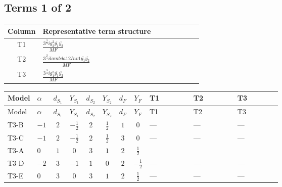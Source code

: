\documentclass[8pt]{article}
\begin{document}
\begin{landscape}
\subsection*{Terms 1 of 2}
\begin{center}
\begin{tabular}{@{}c >{\raggedright\arraybackslash}p{0.82\linewidth}@{}}
\toprule
Column & Representative term structure \\
\midrule
T1 & \(\displaystyle \frac{3^{\frac{3}{4}} i g_{2}^{2} \overline{y_{1}} \overline{y_{2}}}{MF}\) \\
\midrule
T2 & \(\displaystyle \frac{3^{\frac{3}{4}} i lambda12Inv1 \overline{y_{1}} \overline{y_{2}}}{MF}\) \\
\midrule
T3 & \(\displaystyle \frac{3^{\frac{3}{4}} i g_{1}^{2} \overline{y_{1}} \overline{y_{2}}}{MF}\) \\
\midrule
\bottomrule
\end{tabular}
\end{center}
\smallskip
\tiny
\begin{longtable}{@{}llcccccc >{\raggedright\arraybackslash}p{0.21\linewidth} >{\raggedright\arraybackslash}p{0.21\linewidth} >{\raggedright\arraybackslash}p{0.21\linewidth}@{}}
\toprule
Model & $\alpha$ & $d_{S_1}$ & $Y_{S_1}$ & $d_{S_2}$ & $Y_{S_2}$ & $d_F$ & $Y_F$ & T1 & T2 & T3 \\
\midrule
\endfirsthead
\toprule
Model & $\alpha$ & $d_{S_1}$ & $Y_{S_1}$ & $d_{S_2}$ & $Y_{S_2}$ & $d_F$ & $Y_F$ & T1 & T2 & T3 \\
\midrule
\endhead
T3-B & $-1$ & $2$ & $-\frac{1}{2}$ & $2$ & $\frac{1}{2}$ & $1$ & $0$ & --- & --- & --- \\
\midrule
T3-C & $-1$ & $2$ & $-\frac{1}{2}$ & $2$ & $\frac{1}{2}$ & $3$ & $0$ & --- & --- & --- \\
\midrule
T3-A & $0$ & $1$ & $0$ & $3$ & $1$ & $2$ & $\frac{1}{2}$ & \scriptsize\adjustbox{max width=\linewidth}{$\begin{gathered} - \frac{17 \cdot 3^{\frac{3}{4}} i g_{2}^{2} \overline{y_{1}} \overline{y_{2}}}{24 MF}\end{gathered}$} & \scriptsize\adjustbox{max width=\linewidth}{$\begin{gathered} - \frac{3^{\frac{3}{4}} i lambda12Inv1 \overline{y_{1}} \overline{y_{2}}}{6 MF}\end{gathered}$} & \scriptsize\adjustbox{max width=\linewidth}{$\begin{gathered} - \frac{3^{\frac{3}{4}} i g_{1}^{2} \overline{y_{1}} \overline{y_{2}}}{8 MF}\end{gathered}$} \\
\midrule
T3-D & $-2$ & $3$ & $-1$ & $1$ & $0$ & $2$ & $-\frac{1}{2}$ & --- & --- & --- \\
\midrule
T3-E & $0$ & $3$ & $0$ & $3$ & $1$ & $2$ & $\frac{1}{2}$ & --- & --- & --- \\
\midrule
\bottomrule
\end{longtable}
\clearpage

\end{landscape}
\end{document}
